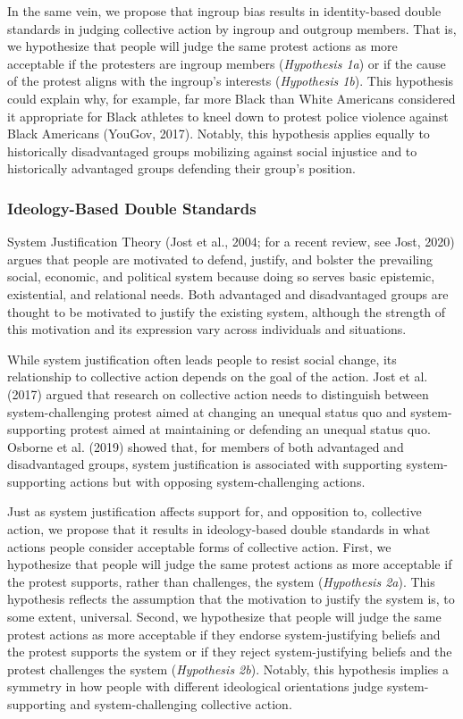 \documentclass[12pt, letterpaper]{article}
\begin{document}
In the same vein, we propose that ingroup bias results in identity-based
double standards in judging collective action by ingroup and outgroup
members. That is, we hypothesize that people will judge the same protest
actions as more acceptable if the protesters are ingroup members
(\emph{Hypothesis 1a}) or if the cause of the protest aligns with the
ingroup's interests (\emph{Hypothesis 1b}). This hypothesis could
explain why, for example, far more Black than White Americans considered
it appropriate for Black athletes to kneel down to protest police
violence against Black Americans (YouGov, 2017). Notably, this
hypothesis applies equally to historically disadvantaged groups
mobilizing against social injustice and to historically advantaged
groups defending their group's position.

\hypertarget{ideology-based-double-standards}{%
\subsubsection{Ideology-Based Double
Standards}\label{ideology-based-double-standards}}

System Justification Theory (Jost et al., 2004; for a recent review, see
Jost, 2020) argues that people are motivated to defend, justify, and
bolster the prevailing social, economic, and political system because
doing so serves basic epistemic, existential, and relational needs. Both
advantaged and disadvantaged groups are thought to be motivated to
justify the existing system, although the strength of this motivation
and its expression vary across individuals and situations.

While system justification often leads people to resist social change,
its relationship to collective action depends on the goal of the action.
Jost et al. (2017) argued that research on collective action needs to
distinguish between system-challenging protest aimed at changing an
unequal status quo and system-supporting protest aimed at maintaining or
defending an unequal status quo. Osborne et al. (2019) showed that, for
members of both advantaged and disadvantaged groups, system
justification is associated with supporting system-supporting actions
but with opposing system-challenging actions.

Just as system justification affects support for, and opposition to,
collective action, we propose that it results in ideology-based double
standards in what actions people consider acceptable forms of collective
action. First, we hypothesize that people will judge the same protest
actions as more acceptable if the protest supports, rather than
challenges, the system (\emph{Hypothesis 2a}). This hypothesis reflects
the assumption that the motivation to justify the system is, to some
extent, universal. Second, we hypothesize that people will judge the
same protest actions as more acceptable if they endorse
system-justifying beliefs and the protest supports the system or if they
reject system-justifying beliefs and the protest challenges the system
(\emph{Hypothesis 2b}). Notably, this hypothesis implies a symmetry in
how people with different ideological orientations judge
system-supporting and system-challenging collective action.
\end{document}
